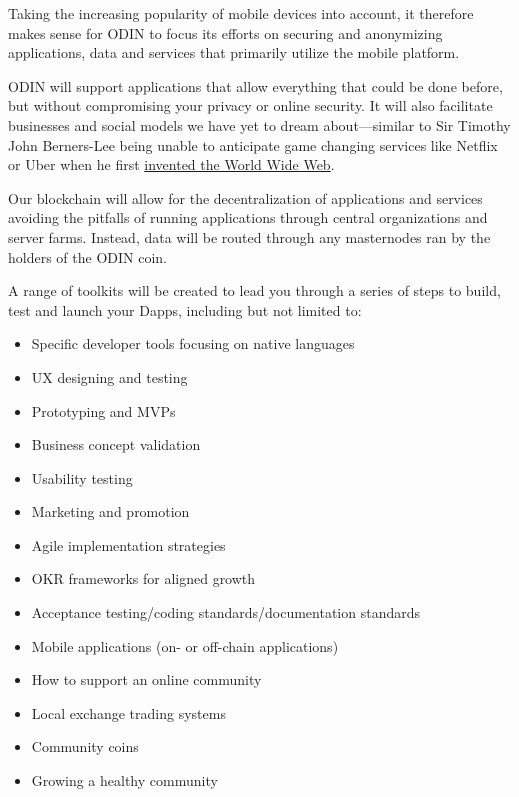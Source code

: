 Taking the increasing popularity of mobile devices into account, it therefore makes sense for ODIN to focus its efforts on securing and anonymizing applications, data and services that primarily utilize the mobile platform.

ODIN will support applications that allow everything that could be done before, but without compromising your privacy or online security. It will also facilitate businesses and social models we have yet to dream about---similar to Sir Timothy John Berners-Lee being unable to anticipate game changing services like Netflix or Uber when he first \href{https://en.wikipedia.org/wiki/Tim_Berners-Lee}{invented the World Wide Web}.

Our blockchain will allow for the decentralization of applications and services avoiding the pitfalls of running applications through central organizations and server farms. Instead, data will be routed through any masternodes ran by the holders of the ODIN coin.

A range of toolkits will be created to lead you through a series of steps to build, test and launch your Dapps, including but not limited to:
\begin{itemize}
   \item Specific developer tools focusing on native languages
   \item UX designing and testing
   \item Prototyping and MVPs
   \item Business concept validation 
   \item Usability testing
   \item Marketing and promotion
   \item Agile implementation strategies
   \item OKR frameworks for aligned growth
   \item Acceptance testing/coding standards/documentation standards
   \item Mobile applications (on- or off-chain applications)
   \item How to support an online community
   \item Local exchange trading systems
   \item Community coins
   \item Growing a healthy community
\end{itemize}

